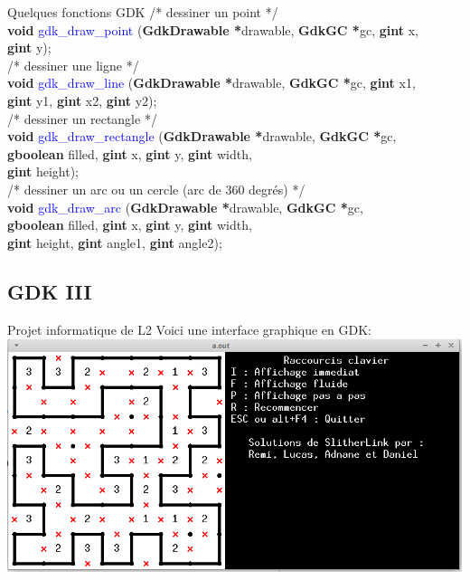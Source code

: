 \documentclass{beamer}
\begin{document}
\begin{frame}{Quelques fonctions GDK}
    \textcolor{brun}{/* dessiner un point */}\\
    \textbf{void} \textcolor{blue}{gdk\_draw\_point} (\textbf{GdkDrawable *}drawable, \textbf{GdkGC *}gc, \textbf{gint} x,\\
    \hspace{4cm}\textbf{gint} y);\\
    \textcolor{brun}{/* dessiner une ligne */}\\
    \textbf{void} \textcolor{blue}{gdk\_draw\_line} (\textbf{GdkDrawable *}drawable, \textbf{GdkGC *}gc, \textbf{gint} x1,\\
    \hspace{3.8cm}\textbf{gint} y1, \textbf{gint} x2, \textbf{gint} y2);\\
    \textcolor{brun}{/* dessiner un rectangle */}\\
    \textbf{void} \textcolor{blue}{gdk\_draw\_rectangle} (\textbf{GdkDrawable *}drawable, \textbf{GdkGC *}gc,\\
    \hspace{4.5cm}\textbf{gboolean} filled, \textbf{gint} x, \textbf{gint} y, \textbf{gint} width,\\
    \hspace{4.5cm}\textbf{gint} height);\\
    \textcolor{brun}{/* dessiner un arc ou un cercle (arc de 360 degrés) */}\\
    \textbf{void} \textcolor{blue}{gdk\_draw\_arc} (\textbf{GdkDrawable *}drawable, \textbf{GdkGC *}gc,\\
    \hspace{3.6cm}\textbf{gboolean} filled, \textbf{gint} x, \textbf{gint} y, \textbf{gint} width,\\
    \hspace{3.6cm}\textbf{gint} height, \textbf{gint} angle1, \textbf{gint} angle2);
\end{frame}

\subsection{GDK III}

\begin{frame}{Projet informatique de L2}
    Voici une interface graphique en GDK:
    \includegraphics[scale=0.39]{slither.png}
\end{frame}
\end{document}
